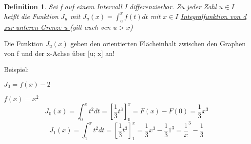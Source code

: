 \documentclass{book}
\newtheorem{definition}{Definition}
\begin{document}
\begin{definition} 
    Sei f auf einem Intervall I differenzierbar. Zu jeder Zahl $u\in I$ heißt die Funktion $J_u$ mit $ J_u (x) = \int_u^x f(t)dt $ mit $x\in I$ \underline{Integralfunktion von d zur unteren Grenze u } (gilt auch ven $ u > x$)
\end{definition}

Die Funktion $J_u(x)$ geben den orientierten Flächeinhalt zwischen den Graphen von f und der x-Achse über [u; x] an!

Beispiel:

$J_0 = f(x) - 2$

$f(x) = x^2$
\[J_0(x) = \int_0^x t^2 dt = [ \frac{1}{3} t^3]_0^x = F(x)-F(0) =\frac13 x^3\]
\[J_1(x) = \int_1^x t^2 dt = [\frac13 t^3]_1^x = \frac 13 x^3 - \frac13 1^3 = \frac 1x^3 - \frac 13\]
\end{document}
